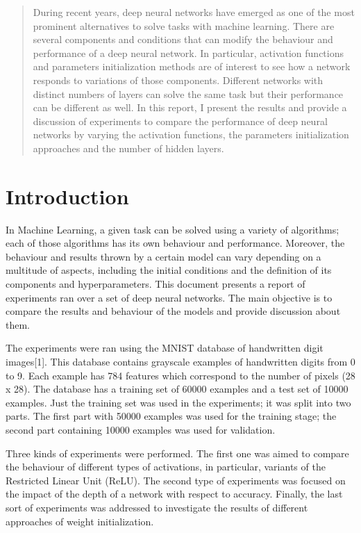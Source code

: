 \documentclass{article}
\def\studentNumber{s1700260}
\begin{document}
 

\twocolumn[
\mlptitle{MLP Coursework 1: Activation Functions}

\centerline{\studentNumber}

\vskip 7mm
]

\begin{abstract} 
During recent years, deep neural networks have emerged as one of the most prominent alternatives to solve tasks with machine learning. There are several components and conditions that can modify the behaviour and performance of a deep neural network. In particular, activation functions and parameters initialization methods are of interest to see how a network responds to variations of those components. Different networks with distinct numbers of layers can solve the same task but their performance can be different as well. In this report, I present the results and provide a discussion of experiments to compare the performance of deep neural networks by varying the activation functions, the parameters initialization approaches and the number of hidden layers.
\end{abstract} 

\section{Introduction}
\label{sec:intro}
In Machine Learning, a given task can be solved using a variety of algorithms; each of those algorithms has its own behaviour and performance. Moreover, the behaviour and results thrown by a certain model can vary depending on a multitude of aspects, including the initial conditions and the definition of its components and hyperparameters. This document presents a report of experiments ran over a set of deep neural networks. The main objective is to compare the results and behaviour of the models and provide discussion about them.

The experiments were ran using the MNIST database of handwritten digit images[1]. This database contains grayscale examples of handwritten digits from 0 to 9. Each example has 784 features which correspond to the number of pixels (28 x 28). The database has a training set of 60000 examples and a test set of 10000 examples. Just the training set was used in the experiments; it was split into two parts. The first part with 50000 examples was used for the training stage; the second part containing 10000 examples was used for validation.

Three kinds of experiments were performed. The first one was aimed to compare the behaviour of different types of activations, in particular, variants of the Restricted Linear Unit (ReLU). The second type of experiments was focused on the impact of the depth of a network with respect to accuracy. Finally, the last sort of experiments was addressed to investigate the results of different approaches of weight initialization.
\end{document}
